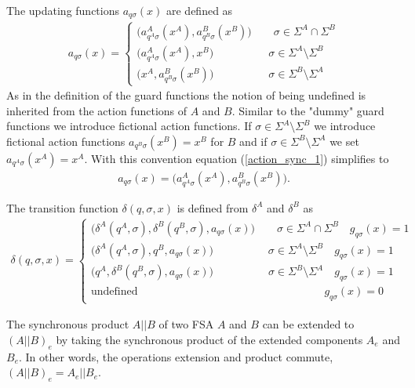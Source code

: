 \documentclass{article}
\begin{document}
The updating functions $a_{q \sigma}(x)$ are defined as
\begin{eqnarray}\label{action_sync_1}
a_{q \sigma}(x)=\left\{
\begin{array}{ll}
 \big(a^A_{q^A \sigma}(x^{A}), a^B_{q^B \sigma}(x^{B})\big)\quad\quad\sigma\in \Sigma^A \cap \Sigma^B\\
\big(a^A_{q^A\sigma}(x^{A}),x^{B}\big)\quad\quad\quad\quad\quad\sigma\in\Sigma^A\setminus\Sigma^B\\
\big(x^{A},a^B_{q^B\sigma}(x^{B})\big)\quad\quad\quad\quad\quad\sigma\in\Sigma^B\setminus\Sigma^A
\end{array}\right.
\end{eqnarray}
As in the definition of the guard functions the notion of being
undefined is inherited from the action functions of $A$ and $B$.
Similar to the "dummy" guard functions we introduce fictional
action functions. If $\sigma\in \Sigma^A \setminus \Sigma^B$ we
introduce fictional action functions $a_{q^B\sigma}(x^B)=x^B$ for
$B$ and if $\sigma\in\Sigma^B\setminus \Sigma^A$ we set
$a_{q^A\sigma}(x^A)=x^A$. With this convention equation
(\ref{action_sync_1}) simplifies to
\begin{eqnarray}
a_{q \sigma}(x)=
 \big(a^A_{q^A \sigma}(x^{A}), a^B_{q^B \sigma}(x^{B})\big).
\end{eqnarray}


 The transition function
$\delta(q,\sigma,x)$ is defined from $\delta^A$ and $\delta^B$ as
\begin{eqnarray}
\delta(q,\sigma,x)=\left\{
\begin{array}{ll}
\big(\delta^A(q^A,\sigma),\delta^B(q^B,\sigma),a_{q \sigma}(x)\big) \quad\quad \sigma\in \Sigma^A \cap \Sigma^B \quad g_{q \sigma}(x)=1\\
\big(\delta^A(q^A,\sigma),q^B,a_{q \sigma}(x)\big) \quad\quad\quad\quad\quad \sigma\in \Sigma^A \setminus \Sigma^B \quad g_{q \sigma}(x)=1\\
\big(q^A,\delta^B(q^B,\sigma),a_{q \sigma}(x)\big) \quad\quad\quad\quad\quad \sigma\in \Sigma^B \setminus \Sigma^A \quad g_{q \sigma}(x)=1\\
\textrm{
undefined}\quad\quad\quad\quad\quad\quad\quad\quad\quad\quad\quad\quad\quad\quad\quad\quad\quad
g_{q\sigma}(x)=0
\end{array}\right.
\end{eqnarray}

The synchronous product $A||B$ of two FSA $A$ and $B$ can be
extended to $(A||B)_e$ by taking the synchronous product of the
extended components  $A_e$ and $B_e$. In other words, the
operations extension and product commute, $(A||B)_e=A_e||B_e$.
\end{document}
